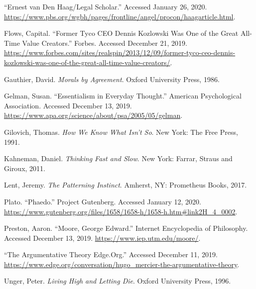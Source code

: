 \documentclass[
  12pt, openany]{book}
\theoremstyle{definition}
\theoremstyle{definition}
\theoremstyle{definition}
\theoremstyle{definition}
\theoremstyle{remark}
\begin{document}
\leavevmode\hypertarget{ref-ErnestVanHaag}{}%
``Ernest van Den Haag/Legal Scholar.'' Accessed January 26, 2020. \url{https://www.pbs.org/wgbh/pages/frontline/angel/procon/haagarticle.html}.

\leavevmode\hypertarget{ref-flowsFormerTycoCEO}{}%
Flows, Capital. ``Former Tyco CEO Dennis Kozlowski Was One of the Great All-Time Value Creators.'' Forbes. Accessed December 21, 2019. \url{https://www.forbes.com/sites/realspin/2013/12/09/former-tyco-ceo-dennis-kozlowski-was-one-of-the-great-all-time-value-creators/}.

\leavevmode\hypertarget{ref-gauthierMoralsAgreement1986}{}%
Gauthier, David. \emph{Morals by Agreement}. Oxford University Press, 1986.

\leavevmode\hypertarget{ref-gelmanEssentialismEverydayThought}{}%
Gelman, Susan. ``Essentialism in Everyday Thought.'' American Psychological Association. Accessed December 13, 2019. \url{https://www.apa.org/science/about/psa/2005/05/gelman}.

\leavevmode\hypertarget{ref-gilovichHowWeKnow1991}{}%
Gilovich, Thomas. \emph{How We Know What Isn't So}. New York: The Free Press, 1991.

\leavevmode\hypertarget{ref-kahnemanThinkingFastSlow2011}{}%
Kahneman, Daniel. \emph{Thinking Fast and Slow}. New York: Farrar, Straus and Giroux, 2011.

\leavevmode\hypertarget{ref-lentPatterningInstinct2017}{}%
Lent, Jeremy. \emph{The Patterning Instinct}. Amherst, NY: Prometheus Books, 2017.

\leavevmode\hypertarget{ref-platoPhaedo}{}%
Plato. ``Phaedo.'' Project Gutenberg. Accessed January 12, 2020. \url{https://www.gutenberg.org/files/1658/1658-h/1658-h.htm\#link2H_4_0002}.

\leavevmode\hypertarget{ref-prestonMooreGeorgeEdward}{}%
Preston, Aaron. ``Moore, George Edward.'' Internet Encyclopedia of Philosophy. Accessed December 13, 2019. \url{https://www.iep.utm.edu/moore/}.

\leavevmode\hypertarget{ref-ArgumentativeTheoryEdge}{}%
``The Argumentative Theory \textbar{} Edge.Org.'' Accessed December 11, 2019. \url{https://www.edge.org/conversation/hugo_mercier-the-argumentative-theory}.

\leavevmode\hypertarget{ref-ungerLivingHighLetting1996}{}%
Unger, Peter. \emph{Living High and Letting Die}. Oxford University Press, 1996.
\end{document}
